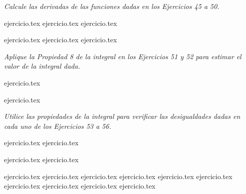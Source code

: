 \vspace{1em}
\noindent \textit{Calcule las derivadas de las funciones dadas en los Ejercicios 45 a 50.}

\begin{enumerate}
    \setcounter{enumi}{44}
    \begin{minipage}{0.45\textwidth}
    {ejercicio.tex}
    {ejercicio.tex}
    {ejercicio.tex}
    \end{minipage}%
    \begin{minipage}{0.45\textwidth}
    {ejercicio.tex}
    {ejercicio.tex}
    {ejercicio.tex}
    \end{minipage}
\end{enumerate}

\vspace{1em}
\noindent \textit{Aplique la Propiedad 8 de la integral en los Ejercicios 51 y 52 para estimar el valor de la integral dada.}

\begin{enumerate}
    \setcounter{enumi}{50}
    \begin{minipage}{0.45\textwidth}
    {ejercicio.tex}
    \end{minipage}%
    \begin{minipage}{0.45\textwidth}
    {ejercicio.tex}
    \end{minipage}
\end{enumerate}

\vspace{1em}
\noindent \textit{Utilice las propiedades de la integral para verificar las desigualdades dadas en cada uno de los Ejercicios 53 a 56.}

\begin{enumerate}
    \setcounter{enumi}{52}
    \begin{minipage}{0.45\textwidth}
    {ejercicio.tex}
    {ejercicio.tex}
    \end{minipage}%
    \begin{minipage}{0.45\textwidth}
    {ejercicio.tex}
    {ejercicio.tex}
    \end{minipage}
\end{enumerate}

\vspace{1em}
\begin{enumerate}
    \setcounter{enumi}{56}
    {ejercicio.tex}
    {ejercicio.tex}
    {ejercicio.tex}
    {ejercicio.tex}
    {ejercicio.tex}
    {ejercicio.tex}
    {ejercicio.tex}
    {ejercicio.tex}
    {ejercicio.tex}
    {ejercicio.tex}
\end{enumerate}

